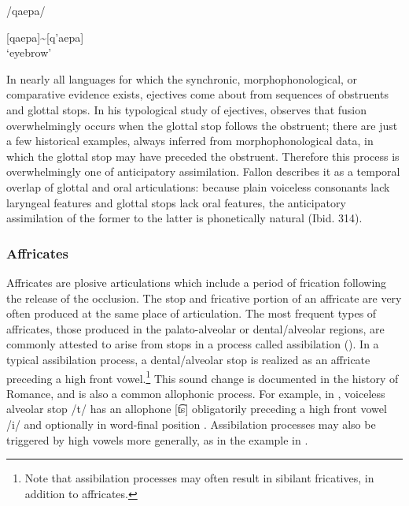 \ea\label{ex:4.44}

/qaepa/

[qaepa]{\textasciitilde}[q’aepa]\\
\glt ‘eyebrow’
\citep[36]{Vidal2001}
\z

  In nearly all languages for which the synchronic, morphophonological, or comparative evidence exists, ejectives come about from sequences of obstruents and glottal stops. In his typological study of ejectives, \citet[314]{Fallon2002} observes that fusion overwhelmingly occurs when the glottal stop follows the obstruent; there are just a few historical examples, always inferred from morphophonological data, in which the glottal stop may have preceded the obstruent. Therefore this process is overwhelmingly one of anticipatory assimilation. Fallon describes it as a temporal overlap of glottal and oral articulations: because plain voiceless consonants lack laryngeal features and glottal stops lack oral features, the anticipatory assimilation of the former to the latter is phonetically natural (Ibid. 314).

\subsubsection{{Affricates}}\label{sec:4.5.2.4}

  Affricates are plosive articulations which include a period of frication following the release of the occlusion. The stop and fricative portion of an affricate are very often produced at the same place of articulation. The most frequent types of affricates, those produced in the palato-alveolar or dental/alveolar regions, are commonly attested to arise from stops in a process called assibilation (\citealt{HallHamann2006,Telfer2006}). In a typical assibilation process, a dental/alveolar stop is realized as an affricate preceding a high front vowel.\footnote{{Note that assibilation processes may often result in sibilant fricatives, in addition to affricates.}} This sound change is documented in the history of Romance, and is also a common allophonic process. For example, in , voiceless alveolar stop /t/ has an allophone [t͡s] obligatorily preceding a high front vowel /i/ and optionally in word-final position \citep[333]{Fortescue1984}. Assibilation processes may also be triggered by high vowels more generally, as in the  example in .

\ea\label{ex:4.45}

